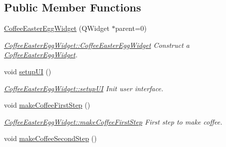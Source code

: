 \subsection*{Public Member Functions}
\begin{DoxyCompactItemize}
\item 
\hyperlink{classGui_1_1Widgets_1_1CoffeeEasterEggWidget_ab95b38ef0c96088bf8b0d0352d8073fb}{Coffee\-Easter\-Egg\-Widget} (Q\-Widget $\ast$parent=0)
\begin{DoxyCompactList}\small\item\em \hyperlink{classGui_1_1Widgets_1_1CoffeeEasterEggWidget_ab95b38ef0c96088bf8b0d0352d8073fb}{Coffee\-Easter\-Egg\-Widget\-::\-Coffee\-Easter\-Egg\-Widget} Construct a \hyperlink{classGui_1_1Widgets_1_1CoffeeEasterEggWidget}{Coffee\-Easter\-Egg\-Widget}. \end{DoxyCompactList}\item 
\hypertarget{classGui_1_1Widgets_1_1CoffeeEasterEggWidget_ae79445a901344a963fc98172fbb3bbd1}{void \hyperlink{classGui_1_1Widgets_1_1CoffeeEasterEggWidget_ae79445a901344a963fc98172fbb3bbd1}{setup\-U\-I} ()}\label{classGui_1_1Widgets_1_1CoffeeEasterEggWidget_ae79445a901344a963fc98172fbb3bbd1}

\begin{DoxyCompactList}\small\item\em \hyperlink{classGui_1_1Widgets_1_1CoffeeEasterEggWidget_ae79445a901344a963fc98172fbb3bbd1}{Coffee\-Easter\-Egg\-Widget\-::setup\-U\-I} Init user interface. \end{DoxyCompactList}\item 
\hypertarget{classGui_1_1Widgets_1_1CoffeeEasterEggWidget_a17acbe1eeebcd0155cd9fdabf6f8001a}{void \hyperlink{classGui_1_1Widgets_1_1CoffeeEasterEggWidget_a17acbe1eeebcd0155cd9fdabf6f8001a}{make\-Coffee\-First\-Step} ()}\label{classGui_1_1Widgets_1_1CoffeeEasterEggWidget_a17acbe1eeebcd0155cd9fdabf6f8001a}

\begin{DoxyCompactList}\small\item\em \hyperlink{classGui_1_1Widgets_1_1CoffeeEasterEggWidget_a17acbe1eeebcd0155cd9fdabf6f8001a}{Coffee\-Easter\-Egg\-Widget\-::make\-Coffee\-First\-Step} First step to make coffee. \end{DoxyCompactList}\item 
\hypertarget{classGui_1_1Widgets_1_1CoffeeEasterEggWidget_a9fd4dcc4291612f880c7d36a1cbd3c53}{void \hyperlink{classGui_1_1Widgets_1_1CoffeeEasterEggWidget_a9fd4dcc4291612f880c7d36a1cbd3c53}{make\-Coffee\-Second\-Step} ()}\label{classGui_1_1Widgets_1_1CoffeeEasterEggWidget_a9fd4dcc4291612f880c7d36a1cbd3c53}


\end{DoxyCompactItemize}
